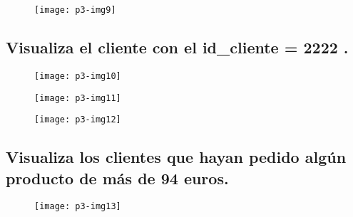 \documentclass[10pt]{article}
\begin{document}
 \begin{figure}[H]
	\begin{center}
 		\texttt{[image: p3-img9]}
	\end{center} 
\end{figure}

\vspace{10cm}
\subsection{Visualiza el cliente con el \textbf{id\_cliente = 2222} .}

 \begin{figure}[H]
	\begin{center}
 		\texttt{[image: p3-img10]}
	\end{center} 
\end{figure}

 \begin{figure}[H]
	\begin{center}
 		\texttt{[image: p3-img11]}
	\end{center} 
\end{figure}

 \begin{figure}[H]
	\begin{center}
 		\texttt{[image: p3-img12]}
	\end{center} 
\end{figure}

\vspace{4cm}
\subsection{Visualiza los clientes que hayan pedido algún producto de más de 94 euros.}

 \begin{figure}[H]
	\begin{center}
 		\texttt{[image: p3-img13]}
	\end{center} 
\end{figure}
\end{document}
